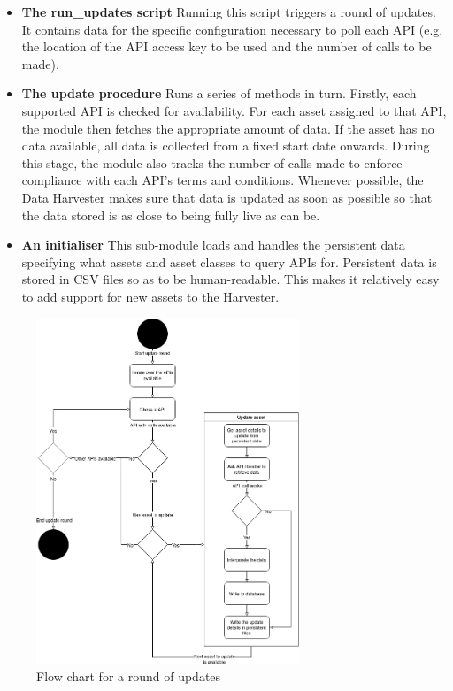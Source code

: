 \documentclass[main.tex]{subfiles}
\begin{document}
\begin{itemize}
    \item \textbf{The run\_updates script} Running this script triggers a round of updates. It contains data for the specific configuration necessary to poll each API (e.g. the location of the API access key to be used and the number of calls to be made).
    \item \textbf{The update procedure} Runs a series of methods in turn. Firstly, each supported API is checked for availability. For each asset assigned to that API, the module then fetches the appropriate amount of data. If the asset has no data available, all data is collected from a fixed start date onwards. During this stage, the module also tracks the number of calls made to enforce compliance with each API's terms and conditions. Whenever possible, the Data Harvester makes sure that data is updated as soon as possible so that the data stored is as close to being fully live as can be.
    \item \textbf{An initialiser} This sub-module loads and handles the persistent data specifying what assets and asset classes to query APIs for. Persistent data is stored in CSV files so as to be human-readable. This makes it relatively easy to add support for new assets to the Harvester.
\end{itemize}

\begin{figure}[H]
    \centering
    \includegraphics[width=0.7\textwidth]{04Design/04Pictures/update_mechanism_flow_chart.png}
    \caption{Flow chart for a round of updates\cite{TR}}
\end{figure}
\end{document}
